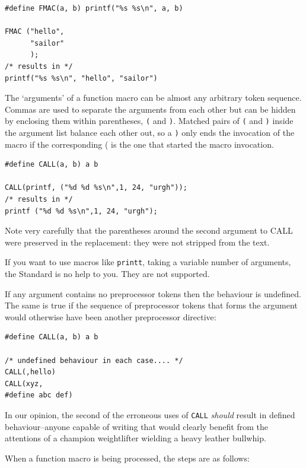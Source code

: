     \begin{Verbatim}
#define FMAC(a, b) printf("%s %s\n", a, b)

FMAC ("hello",
      "sailor"
      );
/* results in */
printf("%s %s\n", "hello", "sailor")
\end{Verbatim}

    The `arguments' of a function macro can be almost any arbitrary
     token sequence. Commas are used to separate the arguments from each
     other but can be hidden by enclosing them within parentheses,
     \texttt{(} and \texttt{)}. Matched pairs of \texttt{(} and
     \texttt{)} inside the argument list balance each other out, so
     a \texttt{)} only ends the invocation of the macro if the
     corresponding ( is the one that started the macro invocation.


    \begin{Verbatim}
#define CALL(a, b) a b

CALL(printf, ("%d %d %s\n",1, 24, "urgh"));
/* results in */
printf ("%d %d %s\n",1, 24, "urgh");
\end{Verbatim}

    Note very carefully that the parentheses around the second argument
     to CALL were preserved in the replacement: they were not stripped from
     the text.


    If you want to use macros like \texttt{printt}, taking a variable
     number of arguments, the Standard is no help to you. They are not
     supported.


    If any argument contains no preprocessor tokens then the behaviour is
     undefined. The same is true if the sequence of preprocessor tokens that
     forms the argument would otherwise have been another preprocessor
     directive:


    \begin{Verbatim}
#define CALL(a, b) a b

/* undefined behaviour in each case.... */
CALL(,hello)
CALL(xyz,
#define abc def)
\end{Verbatim}

    In our opinion, the second of the erroneous uses of \texttt{CALL}
     \textit{should} result in defined behaviour--anyone capable of
     writing that would clearly benefit from the attentions of a champion
     weightlifter wielding a heavy leather bullwhip.


    When a function macro is being processed, the steps are as
     follows:


